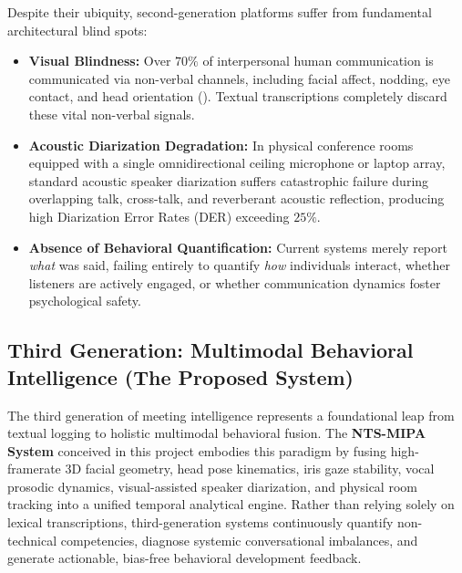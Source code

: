\documentclass[12pt,a4paper,oneside]{report}
\providecommand{\parencite}[1]{(\cite{#1})}
\begin{document}
Despite their ubiquity, second-generation platforms suffer from fundamental architectural blind spots:
\begin{itemize}
    \item \textbf{Visual Blindness:} Over $70\%$ of interpersonal human communication is communicated via non-verbal channels, including facial affect, nodding, eye contact, and head orientation \parencite{ekman1978facial, vinciarelli2009social}. Textual transcriptions completely discard these vital non-verbal signals.
    \item \textbf{Acoustic Diarization Degradation:} In physical conference rooms equipped with a single omnidirectional ceiling microphone or laptop array, standard acoustic speaker diarization suffers catastrophic failure during overlapping talk, cross-talk, and reverberant acoustic reflection, producing high Diarization Error Rates (DER) exceeding $25\%$.
    \item \textbf{Absence of Behavioral Quantification:} Current systems merely report \textit{what} was said, failing entirely to quantify \textit{how} individuals interact, whether listeners are actively engaged, or whether communication dynamics foster psychological safety.
\end{itemize}

\subsection{Third Generation: Multimodal Behavioral Intelligence (The Proposed System)}
The third generation of meeting intelligence represents a foundational leap from textual logging to holistic multimodal behavioral fusion. The \textbf{NTS-MIPA System} conceived in this project embodies this paradigm by fusing high-framerate 3D facial geometry, head pose kinematics, iris gaze stability, vocal prosodic dynamics, visual-assisted speaker diarization, and physical room tracking into a unified temporal analytical engine. Rather than relying solely on lexical transcriptions, third-generation systems continuously quantify non-technical competencies, diagnose systemic conversational imbalances, and generate actionable, bias-free behavioral development feedback.
\end{document}
